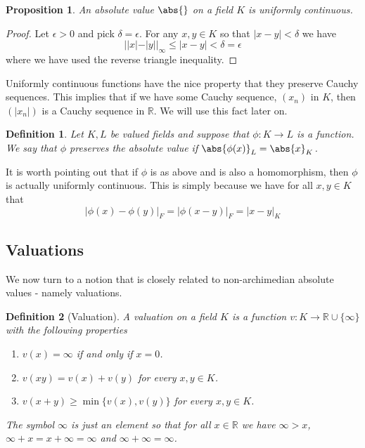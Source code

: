 \documentclass{article}
\newtheorem{definition}{Definition}[section]
\newtheorem{proposition}{Proposition}[section]
\newcommand{\mbb}[1]{\mathbb{#1}}
\numberwithin{equation}{section}
\begin{document}
\begin{proposition}
    An absolute value $\abs{}$ on a field $K$ is uniformly continuous.
\end{proposition}
\begin{proof}
    Let $\epsilon > 0$ and pick $\delta = \epsilon$. For any $x,y \in K$ so that $|x - y| < \delta$ we have
    $$||x| - |y||_\infty \leq |x - y| < \delta = \epsilon$$
    where we have used the reverse triangle inequality.
\end{proof}

Uniformly continuous functions have the nice property that they preserve Cauchy sequences. This implies that if we have some Cauchy sequence, $(x_n)$ in $K$, then $(|x_n|)$ is a Cauchy sequence in $\mbb R$. We will use this fact later on.

\begin{definition}
    Let $K, L$ be valued fields and suppose that $\phi : K \to L$ is a function. We say that $\phi$ preserves the absolute value if $\abs{\phi(x)}_L = \abs{x}_K$.
\end{definition}

It is worth pointing out that if $\phi$ is as above and is also a homomorphism, then $\phi$ is actually uniformly continuous. This is simply because we have for all $x,y \in K$ that
$$|\phi(x) - \phi(y)|_F = |\phi(x-y)|_F = |x-y|_K$$




\subsection{Valuations}
We now turn to a notion that is closely related to non-archimedian absolute values - namely valuations.

\begin{definition}[Valuation]\label{def: Valuation}
    A valuation on a field $K$ is a function $v : K \to \mbb R \cup \{\infty\}$ with the following properties
    \begin{enumerate}
        \item $v(x) = \infty$ if and only if $x = 0$.
        \item $v(xy) = v(x) + v(y)$ for every $x,y \in K$.
        \item $v(x + y) \geq \min \{v(x), v(y)\}$ for every $x,y \in K$.
    \end{enumerate}
    The symbol $\infty$ is just an element so that for all $x \in \mbb R$ we have $\infty > x$,  $\infty + x = x + \infty = \infty$ and $\infty + \infty = \infty$.
\end{definition}
\end{document}
